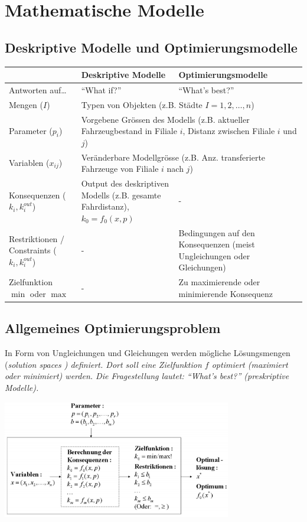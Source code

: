 \section{Mathematische Modelle }
\subsection{Deskriptive Modelle und Optimierungsmodelle }
  \begin{tabular}{|p{3.7cm}|p{7cm}|p{7cm}|}
    \hline
    & \textbf{Deskriptive Modelle}
    & \textbf{Optimierungsmodelle} \\
    \hline
    \hline
    Antworten auf\ldots
      & ``What if?''
      & ``What's best?'' \\
    \hline
    Mengen ($I$)
      & \multicolumn{2}{l|}{Typen von Objekten (z.B. Städte $I = {1,2,\ldots,n}$)} \\
    \hline
    Parameter ($p_i$)
      & \multicolumn{2}{p{14cm}|}{Vorgebene Grössen des Modells (z.B. aktueller Fahrzeugbestand in Filiale $i$, Distanz zwischen Filiale $i$ und $j$)} \\
    \hline
    Variablen ($x_{ij}$)
      & \multicolumn{2}{l|}{Veränderbare Modellgrösse (z.B. Anz. transferierte Fahrzeuge von Filiale $i$ nach $j$)} \\
    \hline
    Konsequenzen ($k_{i}, k_i^{out}$)
      & Output des deskriptiven Modells (z.B. gesamte Fahrdistanz), $k_0 = f_0(x,p)$ 
      & -\\
    \hline
    Restriktionen / Constraints ($k_{i}, k_i^{out}$)
      & - 
      & Bedingungen auf den Konsequenzen (meist Ungleichungen oder Gleichungen)\\
    \hline
    Zielfunktion $\min$ oder $\max$
      & - 
      & Zu maximierende oder minimierende Konsequenz\\
    \hline
  \end{tabular}


\subsection{Allgemeines Optimierungsproblem }
  In Form von Ungleichungen und Gleichungen werden mögliche Lösungsmengen (\em solution spaces \em) definiert. Dort soll eine Zielfunktion $f$ optimiert (maximiert oder minimiert) werden. Die Fragestellung lautet: "`What's best?"' (preskriptive Modelle).
  
  \begin{center}
    \includegraphics[width=10cm]{./Content/OptMathModels/OptimiziationModel}
  \end{center}

